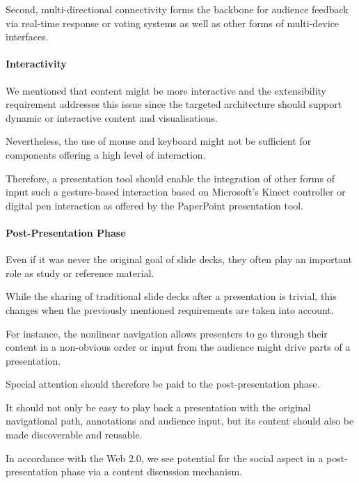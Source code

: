       Second, multi-directional connectivity forms the backbone for
      audience feedback via real-time response or voting systems
      \citep{dufresne-1} as well as other forms of multi-device interfaces.

     \paragraph{Interactivity}
     
      We mentioned that content might be more
      interactive and the extensibility requirement addresses this issue since
      the targeted architecture should support dynamic or interactive content
      and visualisations.
     
      Nevertheless, the use of mouse and keyboard might not
      be sufficient for components offering a high level of interaction.

      Therefore, a presentation tool should enable the integration of other
      forms of input such a gesture-based interaction based on Microsoft's
      Kinect controller or digital pen interaction \citep{signer-2} as offered
      by the PaperPoint \citep{signer-1} presentation tool.

     \paragraph{Post-Presentation Phase}
     
      Even if it was never the original goal
      of slide decks, they often play an important role as study or reference
      material.
     
      While the sharing of traditional slide decks after a
      presentation is trivial, this changes when the previously mentioned
      requirements are taken into account.
     
      For instance, the nonlinear
      navigation allows presenters to go through their content in a non-obvious
      order or input from the audience might drive parts of a presentation.

      Special attention should therefore be paid to the post-presentation
      phase.
     
      It should not only be easy to play back a presentation with the
      original navigational path, annotations and audience input, but its
      content should also be made discoverable and reusable.
     
      In accordance with
      the Web 2.0, we see potential for the social aspect in a
      post-presentation phase via a content discussion mechanism.

